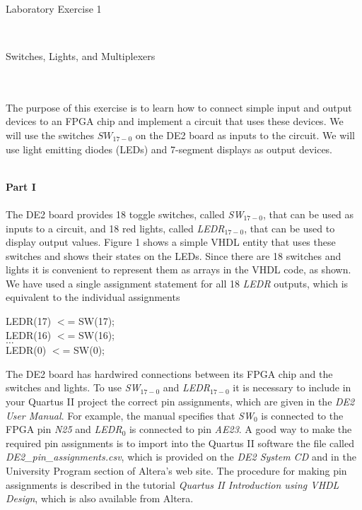 \documentclass[psfig,10pt,fullpage]{article}
\begin{document}
~\\
~\\
~\\
\centerline{\huge Laboratory Exercise 1}
~\\
\centerline{\large Switches, Lights, and Multiplexers}
~\\
~\\

The purpose of this exercise is to learn how to connect simple input and
output devices to an FPGA chip and implement a circuit that uses these devices.
We will use the switches $SW_{17-0}$ on the DE2 board as inputs to the circuit.
We will use light emitting diodes (LEDs) and 7-segment displays as output
devices.

~\\
\noindent
{\bf Part I}
~\\
~\\
\noindent
The DE2 board provides 18 toggle switches, called {\it SW}$_{17-0}$, that can be used as
inputs to a circuit, and 18 red lights, called {\it LEDR}$_{17-0}$, that can be used to
display output values. Figure 1 shows a simple VHDL entity that uses these switches 
and shows their states on the LEDs. Since there are 18 switches and lights
it is convenient to represent them as arrays in the VHDL code, as shown. We have used a
single assignment statement for all 18 {\it LEDR} outputs, which is equivalent to the 
individual assignments

\begin{center}
\begin{minipage}[t]{12.5 cm}
\begin{tabbing}
LEDR(17) $<$= SW(17);\\
LEDR(16) $<$= SW(16);\\
$\ldots$\\
LEDR(0) $<$= SW(0);
\end{tabbing}
\end{minipage}
\end{center}
The DE2 board has hardwired connections between its FPGA chip and the switches and
lights. To use {\it SW}$_{17-0}$ and {\it LEDR}$_{17-0}$ it is necessary to include in
your Quartus II project the correct pin assignments, which are given in the {\it DE2 
User Manual}. For example, the manual specifies that {\it SW}$_0$ is connected to the
FPGA pin {\it N25} and {\it LEDR}$_0$ is connected to pin {\it AE23}. A good way to
make the required pin assignments is to import into the Quartus II software the file called
{\it DE2\_pin\_assignments.csv}, which is provided on the {\it DE2 System CD} and 
in the University Program section of
Altera's web site.  The procedure for making pin assignments is described in the 
tutorial {\it Quartus II Introduction using VHDL Design}, which is also available from
Altera.
\end{document}
